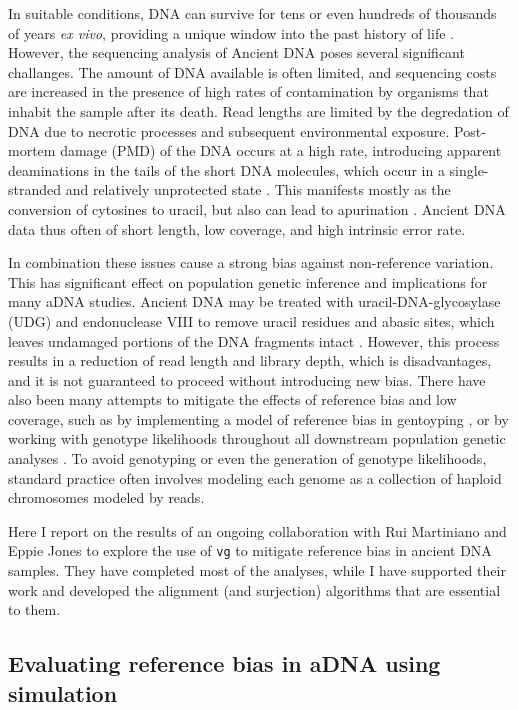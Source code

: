 In suitable conditions, DNA can survive for tens or even hundreds of thousands of years \emph{ex vivo}, providing a unique window into the past history of life \cite{dabney2013ancient}.
However, the sequencing analysis of Ancient DNA poses several significant challanges.
The amount of DNA available is often limited, and sequencing costs are increased in the presence of high rates of contamination by organisms that inhabit the sample after its death.
Read lengths are limited by the degredation of DNA due to necrotic processes and subsequent environmental exposure.
Post-mortem damage (PMD) of the DNA occurs at a high rate, introducing apparent deaminations in the tails of the short DNA molecules, which occur in a single-stranded and relatively unprotected state \cite{link2017atlas}.
This manifests mostly as the conversion of cytosines to uracil, but also can lead to apurination \cite{dabney2013ancient}.
Ancient DNA data thus often of short length, low coverage, and high intrinsic error rate.

In combination these issues cause a strong bias against non-reference variation.
This has significant effect on population genetic inference and implications for many aDNA studies.
Ancient DNA may be treated with uracil-DNA-glycosylase (UDG) and endonuclease VIII to remove uracil residues and abasic sites, which leaves undamaged portions of the DNA fragments intact \cite{briggs2009removal}.
However, this process results in a reduction of read length and library depth, which is disadvantages, and it is not guaranteed to proceed without introducing new bias.
There have also been many attempts to mitigate the effects of reference bias and low coverage, such as by implementing a model of reference bias in gentoyping \cite{pruefer2018snpad}, or by working with genotype likelihoods throughout all downstream population genetic analyses \cite{link2017atlas}.
To avoid genotyping or even the generation of genotype likelihoods, standard practice often involves modeling each genome as a collection of haploid chromosomes modeled by reads.

Here I report on the results of an ongoing collaboration with Rui Martiniano and Eppie Jones to explore the use of {\tt vg} to mitigate reference bias in ancient DNA samples.
They have completed most of the analyses, while I have supported their work and developed the alignment (and surjection) algorithms that are essential to them.

\subsection{Evaluating reference bias in aDNA using simulation}

